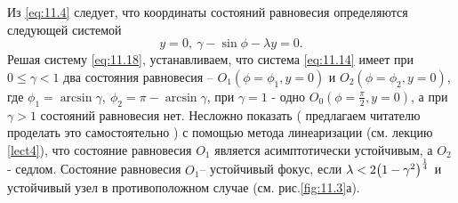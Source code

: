 Из \eqref{eq:11.4} следует, что координаты состояний равновесия определяются 
следующей системой
\begin{equation}
        \label{eq:11.18}
        y=0,~\gamma-\sin \phi - \lambda y =0.
\end{equation}
Решая систему \eqref{eq:11.18}, устанавливаем, что система \eqref{eq:11.14} имеет при 
$0 \leq \gamma <1$ два состояния равновесия -- $O_{1}(\phi=\phi_{1},y=0)$ и 
$O_{2}(\phi=\phi_{2},y=0)$, где $\phi_{1}=\arcsin \gamma,~ \phi_{2}= \pi-\arcsin \gamma $, при 
$\gamma=1$ - одно $O_{0}(\phi=\frac{\pi}{2},y=0)$, а при $\gamma>1$ состояний равновесия нет.
Несложно показать ( предлагаем читателю проделать это самостоятельно ) с помощью метода линеаризации
(см. лекцию \ref{lect4}), что состояние равновесия $O_{1}$ является асимптотически устойчивым,
а $O_{2}$ - седлом.
Состояние равновесия $O_{1}$-- устойчивый фокус, если $\lambda < 2 \qty(1-\gamma^2)^\frac{1}{4}$
и устойчивый узел в противоположном случае (см. рис.\ref{fig:11.3}а).

